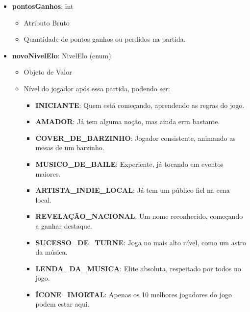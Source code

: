 \begin{itemize}
        \item \textbf{pontosGanhos}: int  
              \begin{itemize}
                  \item Atributo Bruto
                  \item Quantidade de pontos ganhos ou perdidos na partida.
              \end{itemize}
    
        \item \textbf{novoNivelElo}: NivelElo (enum)  
              \begin{itemize}
                  \item Objeto de Valor
                  \item Nível do jogador após essa partida, podendo ser:
                  \begin{itemize}
                      \item \textbf{INICIANTE}: Quem está começando, aprendendo as regras do jogo.
                      \item \textbf{AMADOR}: Já tem alguma noção, mas ainda erra bastante.
                      \item \textbf{COVER\_DE\_BARZINHO}: Jogador consistente, animando as mesas de um barzinho.
                      \item \textbf{MUSICO\_DE\_BAILE}: Experiente, já tocando em eventos maiores.
                      \item \textbf{ARTISTA\_INDIE\_LOCAL}: Já tem um público fiel na cena local.
                      \item \textbf{REVELAÇÃO\_NACIONAL}: Um nome reconhecido, começando a ganhar destaque.
                      \item \textbf{SUCESSO\_DE\_TURNE}: Joga no mais alto nível, como um astro da música.
                      \item \textbf{LENDA\_DA\_MUSICA}: Elite absoluta, respeitado por todos no jogo.
                      \item \textbf{ÍCONE\_IMORTAL}: Apenas os 10 melhores jogadores do jogo podem estar aqui.
                  \end{itemize}
              \end{itemize}
    \end{itemize}
    
